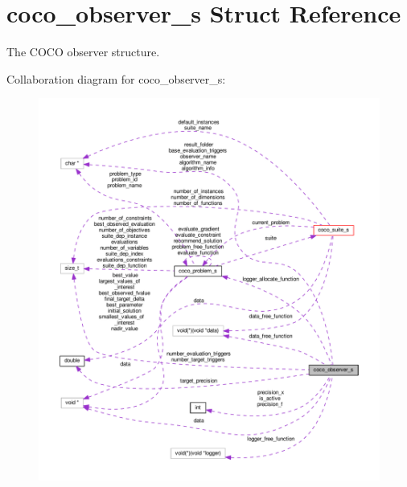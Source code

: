 \hypertarget{structcoco__observer__s}{}\section{coco\+\_\+observer\+\_\+s Struct Reference}
\label{structcoco__observer__s}


The C\+O\+CO observer structure.  




Collaboration diagram for coco\+\_\+observer\+\_\+s\+:\nopagebreak
\begin{figure}[H]
\begin{center}
\leavevmode
\includegraphics[width=350pt]{structcoco__observer__s__coll__graph}
\end{center}
\end{figure}
